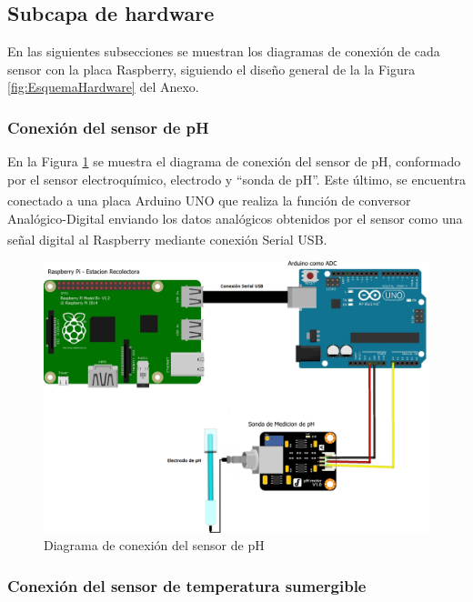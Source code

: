     \subsection{Subcapa de hardware}
        \par En las siguientes subsecciones se muestran los diagramas de conexión de cada sensor con la placa Raspberry, siguiendo el diseño general de la la Figura \ref{fig:EsquemaHardware} del Anexo.

    \subsubsection{Conexión del sensor de pH}

        \par En la Figura \ref{fig:ConexionSensorpH} se muestra el diagrama de conexión del sensor de pH, conformado por el sensor electroquímico, electrodo y ``sonda de pH''. Este último, se encuentra conectado a una placa Arduino\textsuperscript{\textregistered} UNO que realiza la función de conversor Analógico-Digital enviando los datos analógicos obtenidos por el sensor como una señal digital al Raspberry\textsuperscript{\textregistered} mediante conexión Serial USB.
        
        \begin{figure}[h]
            \centering
            \includegraphics[scale=0.25]{hardware/DiagramaSensordepH_bb2.jpg}
            \caption{Diagrama de conexión del sensor de pH}
            \label{fig:ConexionSensorpH}
        \end{figure}

    \subsubsection{Conexión del sensor de temperatura sumergible}

